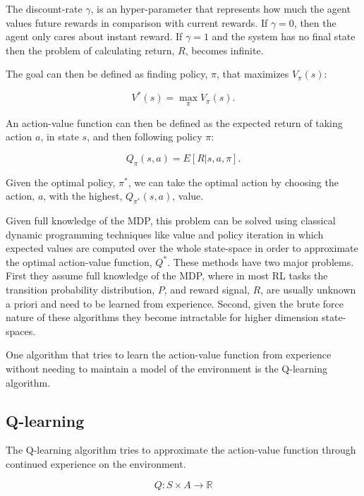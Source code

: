 The discount-rate $\gamma$, is an hyper-parameter that represents how much the agent values future rewards in comparison with current rewards. If $\gamma=0$, then the agent only cares about instant reward. If $\gamma=1$ and the system has no final state then the problem of calculating return, $R$, becomes infinite.

The goal can then be defined as finding policy, $\pi$, that maximizes $V_\pi(s)$:

\begin{equation} \label{maximizes_expected}
V^*(s)=\max\limits_{\pi}V_\pi(s) .
\end{equation}

An action-value function can then be defined as the expected return of taking action $a$, in state $s$, and then following policy $\pi$:

\begin{equation}
Q_\pi(s,a) = E[R|s, a, \pi] .
\end{equation}

Given the optimal policy, $\pi^*$, we can take the optimal action by choosing the action, $a$, with the highest, $Q_{\pi^*}(s,a)$, value. 

Given full knowledge of the \acrshort{MDP}, this problem can be solved using classical dynamic programming techniques like value and policy iteration in which expected values are computed over the whole state-space in order to approximate the optimal action-value function, $Q^*$. These methods have two major problems. First they assume full knowledge of the \acrshort{MDP}, where in most \acrshort{RL} tasks the transition probability distribution, $P$, and reward signal, $R$, are usually unknown a priori and need to be learned from experience. Second, given the brute force nature of these algorithms they become intractable for higher dimension state-spaces.

One algorithm that tries to learn the action-value function from experience without needing to maintain a model of the environment is the Q-learning algorithm.
\subsection{Q-learning}
\noindent The Q-learning algorithm tries to approximate the action-value function through continued experience on the environment.

\begin{equation}
    Q:S\times A \rightarrow \mathbb{R}
\end{equation}\label{Qval}

